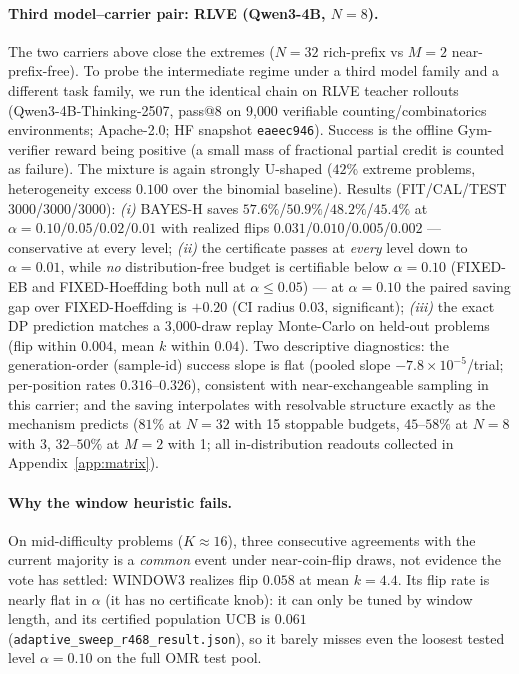 \documentclass{article}
\theoremstyle{definition}
\theoremstyle{remark}
\begin{document}
\paragraph{Third model--carrier pair: RLVE (Qwen3-4B, $N=8$).} The two
carriers above close the extremes ($N{=}32$ rich-prefix vs $M{=}2$
near-prefix-free). To probe the intermediate regime under a third model
family and a different task family, we run the identical chain on RLVE
teacher rollouts (Qwen3-4B-Thinking-2507, pass@8 on 9{,}000 verifiable
counting/combinatorics environments; Apache-2.0; HF snapshot
\texttt{eaeec946}). Success is the offline Gym-verifier reward being positive
(a small mass of fractional partial credit is counted as failure). The
mixture is again strongly U-shaped ($42\%$ extreme problems, heterogeneity
excess $0.100$ over the binomial baseline). Results (FIT/CAL/TEST
3000/3000/3000): \emph{(i)} BAYES-H saves $57.6\%$/$50.9\%$/$48.2\%$/$45.4\%$
at $\alpha=0.10/0.05/0.02/0.01$ with realized flips
$0.031$/$0.010$/$0.005$/$0.002$ --- conservative at every level;
\emph{(ii)} the certificate passes at \emph{every} level down to
$\alpha=0.01$, while \emph{no} distribution-free budget is certifiable below
$\alpha=0.10$ (FIXED-EB and FIXED-Hoeffding both null at
$\alpha\le0.05$) --- at $\alpha=0.10$ the paired saving gap over
FIXED-Hoeffding is $+0.20$ (CI radius $0.03$, significant); \emph{(iii)} the
exact DP prediction matches a 3{,}000-draw replay Monte-Carlo on held-out
problems (flip within $0.004$, mean $k$ within $0.04$). Two descriptive
diagnostics: the generation-order (sample-id) success slope is flat
(pooled slope $-7.8\times10^{-5}$/trial; per-position rates $0.316$--$0.326$),
consistent with near-exchangeable sampling in this carrier; and the saving
interpolates with resolvable structure exactly as the mechanism predicts
($81\%$ at $N{=}32$ with 15 stoppable budgets, $45$--$58\%$ at $N{=}8$ with
3, $32$--$50\%$ at $M{=}2$ with 1; all in-distribution readouts collected in
Appendix~\ref{app:matrix}).

\paragraph{Why the window heuristic fails.} On mid-difficulty problems
($K\approx16$), three consecutive agreements with the current majority is a
\emph{common} event under near-coin-flip draws, not evidence the vote has
settled: WINDOW3 realizes flip $0.058$ at mean $k=4.4$. Its flip rate is
nearly flat in $\alpha$ (it has no certificate knob): it can only be tuned by
window length, and its certified population UCB is $0.061$
(\texttt{adaptive\_sweep\_r468\_result.json}), so it barely misses even the
loosest tested level $\alpha=0.10$ on the full OMR test pool.
\end{document}
